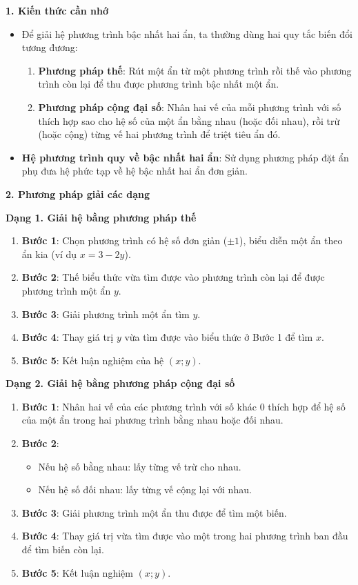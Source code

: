 \textbf{1. Kiến thức cần nhớ}
\begin{itemize}
\item Để giải hệ phương trình bậc nhất hai ẩn, ta thường dùng hai quy tắc biến đổi tương đương:
\begin{enumerate}
\item \textbf{Phương pháp thế}: Rút một ẩn từ một phương trình rồi thế vào phương trình còn lại để thu được phương trình bậc nhất một ẩn.
\item \textbf{Phương pháp cộng đại số}: Nhân hai vế của mỗi phương trình với số thích hợp sao cho hệ số của một ẩn bằng nhau (hoặc đối nhau), rồi trừ (hoặc cộng) từng vế hai phương trình để triệt tiêu ẩn đó.
\end{enumerate}
\item \textbf{Hệ phương trình quy về bậc nhất hai ẩn}: Sử dụng phương pháp đặt ẩn phụ đưa hệ phức tạp về hệ bậc nhất hai ẩn đơn giản.
\end{itemize}

\textbf{2. Phương pháp giải các dạng}

\textbf{Dạng 1. Giải hệ bằng phương pháp thế}
\begin{enumerate}
\item \textbf{Bước 1}: Chọn phương trình có hệ số đơn giản ($\pm 1$), biểu diễn một ẩn theo ẩn kia (ví dụ $x = 3 - 2y$).
\item \textbf{Bước 2}: Thế biểu thức vừa tìm được vào phương trình còn lại để được phương trình một ẩn $y$.
\item \textbf{Bước 3}: Giải phương trình một ẩn tìm $y$.
\item \textbf{Bước 4}: Thay giá trị $y$ vừa tìm được vào biểu thức ở Bước 1 để tìm $x$.
\item \textbf{Bước 5}: Kết luận nghiệm của hệ $(x; y)$.
\end{enumerate}

\textbf{Dạng 2. Giải hệ bằng phương pháp cộng đại số}
\begin{enumerate}
\item \textbf{Bước 1}: Nhân hai vế của các phương trình với số khác $0$ thích hợp để hệ số của một ẩn trong hai phương trình bằng nhau hoặc đối nhau.
\item \textbf{Bước 2}:
\begin{itemize}
\item Nếu hệ số bằng nhau: lấy từng vế trừ cho nhau.
\item Nếu hệ số đối nhau: lấy từng vế cộng lại với nhau.
\end{itemize}
\item \textbf{Bước 3}: Giải phương trình một ẩn thu được để tìm một biến.
\item \textbf{Bước 4}: Thay giá trị vừa tìm được vào một trong hai phương trình ban đầu để tìm biến còn lại.
\item \textbf{Bước 5}: Kết luận nghiệm $(x; y)$.
\end{enumerate}

